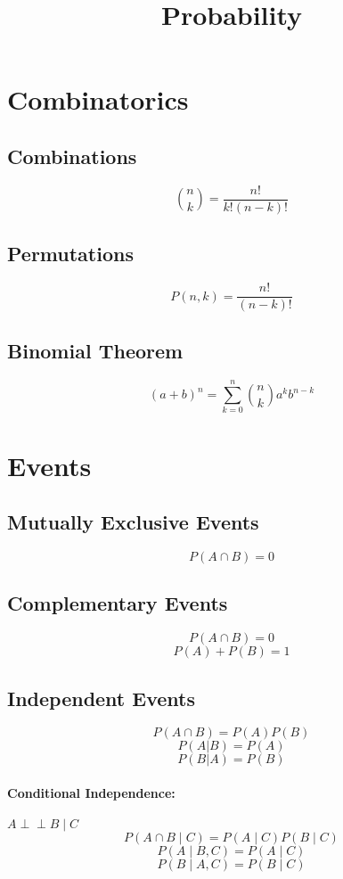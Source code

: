 \documentclass{article}
\title{Probability}
\date{}
\begin{document}
\maketitle

\tableofcontents

\newpage
\section{Combinatorics}

\subsection{Combinations}
\[
    \binom{n}{k} = \frac{n!}{k!(n-k)!}
\]

\subsection{Permutations}
\[
    P(n, k) = \frac{n!}{(n-k)!}
\]

\subsection{Binomial Theorem}
\[
    (a+b)^n = \sum_{k=0}^{n} \binom{n}{k} a^k b^{n-k}
\]

\newpage
\section{Events}

\subsection{Mutually Exclusive Events}
\[
    P(A \cap B) = 0
\]

\subsection{Complementary Events}
\[
    P(A \cap B) = 0
\]
\[
    P(A) + P(B) = 1
\]

\subsection{Independent Events}
\[
    P(A \cap B) = P(A)P(B)
\]
\[
    P(A|B) = P(A)
\]
\[
    P(B|A) = P(B)
\]

\paragraph{Conditional Independence: }\( A \perp\!\!\!\perp B \mid C \)
\[
    P(A \cap B \mid C) = P(A \mid C) P(B \mid C)
\]
\[
    P(A \mid B, C) = P(A \mid C)
\]
\[
    P(B \mid A, C) = P(B \mid C)
\]
\end{document}

